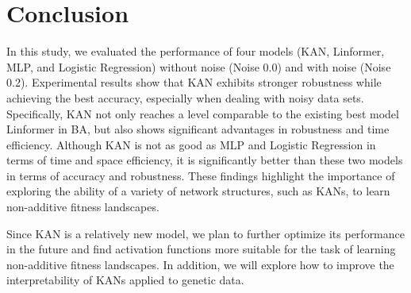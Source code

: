 \documentclass{article}
\begin{document}
 \section{Conclusion}
In this study, we evaluated the performance of four models (KAN, Linformer, MLP, and Logistic Regression) without noise (Noise 0.0) and with noise (Noise 0.2). Experimental results show that KAN exhibits stronger robustness while achieving the best accuracy, especially when dealing with noisy data sets. Specifically, KAN not only reaches a level comparable to the existing best model Linformer in BA, but also shows significant advantages in robustness and time efficiency. Although KAN is not as good as MLP and Logistic Regression in terms of time and space efficiency, it is significantly better than these two models in terms of accuracy and robustness. These findings highlight the importance of exploring the ability of a variety of network structures, such as KANs, to learn non-additive fitness landscapes.

Since KAN is a relatively new model, we plan to further optimize its performance in the future and find activation functions more suitable for the task of learning non-additive fitness landscapes. In addition, we will explore how to improve the interpretability of KANs applied to genetic data.




\printbibliography 
\end{document}
